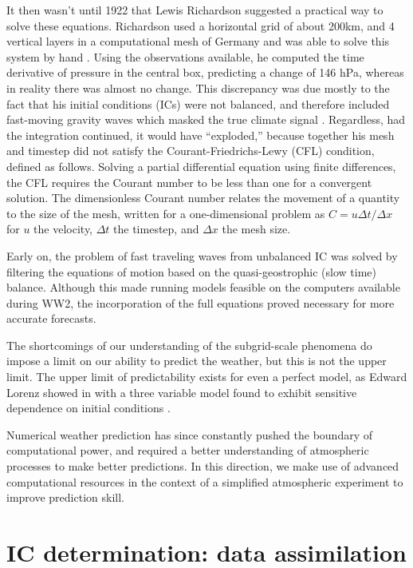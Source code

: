 \documentclass[12pt]{report}
\begin{document}
It then wasn't until 1922 that Lewis Richardson suggested a practical way to solve these equations.
Richardson used a horizontal grid of about 200km, and 4 vertical layers in a computational mesh of Germany and was able to solve this system by hand .
Using the observations available, he computed the time derivative of pressure in the central box, predicting a change of 146 hPa, whereas in reality there was almost no change.
This discrepancy was due mostly to the fact that his initial conditions (ICs) were not balanced, and therefore included fast-moving gravity waves which masked the true climate signal .
Regardless, had the integration continued, it would have ``exploded,'' because together his mesh and timestep did not satisfy the Courant-Friedrichs-Lewy (CFL) condition, defined as follows.
Solving a partial differential equation using finite differences, the CFL requires the Courant number to be less than one for a convergent solution.
The dimensionless Courant number relates the movement of a quantity to the size of the mesh, written for a one-dimensional problem as $C = u \Delta t/\Delta x $ for $u$ the velocity, $\Delta t$ the timestep, and $\Delta x$ the mesh size.

Early on, the problem of fast traveling waves from unbalanced IC was solved by filtering the equations of motion based on the quasi-geostrophic (slow time) balance.
Although this made running models feasible on the computers available during WW2, the incorporation of the full equations proved necessary for more accurate forecasts.

The shortcomings of our understanding of the subgrid-scale phenomena do impose a limit on our ability to predict the weather, but this is not the upper limit.
The upper limit of predictability exists for even a perfect model, as Edward Lorenz showed in with a three variable model found to exhibit sensitive dependence on initial conditions .

Numerical weather prediction has since constantly pushed the boundary of computational power, and required a better understanding of atmospheric processes to make better predictions.
In this direction, we make use of advanced computational resources in the context of a simplified atmospheric experiment to improve prediction skill.

\section{IC determination: data assimilation}
\end{document}
